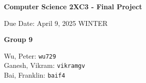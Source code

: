 \documentclass{article}
\date{}
\begin{document}
\begin{doublespace}
\title{\textbf{\vspace{1em}{}}}
\maketitle

\centering
{\LARGE \bfseries Computer Science 2XC3 - Final Project}
\vspace{3em}

{\Large Due Date: April 9, 2025 WINTER}\vspace{1.5em}

{\large \textbf{Group 9}}

{\large  Wu, Peter: \texttt{wu729}~\\
  Ganesh, Vikram: \texttt{vikramgv}~\\
  \vspace{0.5em}
  Bai, Franklin: \texttt{baif4}}~\\


\end{doublespace}

\newpage
\end{document}
